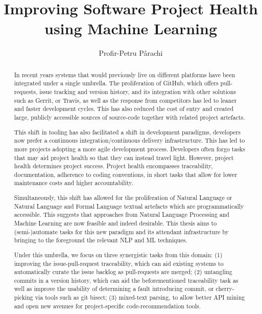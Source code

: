 
\title{Improving Software Project Health using Machine Learning}
\author{Profir-Petru P\^arachi}

\maketitle
\makedeclaration

\begin{abstract} %
In recent years systems that would previously live on different platforms
have been integrated under a single umbrella. The proliferation of GitHub,
which offers pull-requests, issue tracking and version history, and its
integration with other solutions such as Gerrit, or Travis, as well as the
response from competitors has led to leaner and faster development cycles.
This has also reduced the cost of entry and created large, publicly
accessible sources of source-code together with related project artefacts.

This shift in tooling has also facilitated a shift in development paradigms,
developers now prefer a continuous integration/continuous delivery
infrastructure. This has led to more projects adopting a more agile
development process. Developers often forgo tasks that may aid project
health so that they can instead travel light. However, project health
determines project success.  Project health encompasses traceability,
documentation, adherence to coding conventions, in short tasks that allow
for lower maintenance costs and higher accountability.

Simultaneously, this shift has allowed for the proliferation of Natural
Language or Natural Language and Formal Language textual artefacts which are
programmatically accessible. This suggests that approaches from Natural
Language Processing and Machine Learning are now feasible and indeed
desirable. This thesis aims to (semi-)automate tasks for this new paradigm
and its attendant infrastructure by bringing to the foreground the relevant
NLP and ML techniques.

Under this umbrella, we focus on three synergistic tasks from this domain:
(1) improving the issue-pull-request traceability, which can aid existing
systems to automatically curate the issue backlog as pull-requests are
merged; (2) untangling commits in a version history, which can aid the
beforementioned traceability task as well as improve the usability of
determining a fault introducing commit, or cherry-picking via tools such as
git bisect; (3) mixed-text parsing, to allow better API mining and open new
avenues for project-specific code-recommendation tools.	
\end{abstract}

